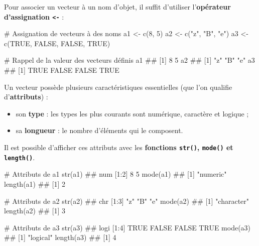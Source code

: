 \documentclass[12pt,twosided, notitlepage]{book}
\newenvironment{Shaded}{}{}
\newcommand{\KeywordTok}[1]{\textcolor[rgb]{0.00,0.00,1.00}{#1}}
\newcommand{\DecValTok}[1]{#1}
\newcommand{\StringTok}[1]{\textcolor[rgb]{0.00,0.50,0.50}{#1}}
\newcommand{\CommentTok}[1]{\textcolor[rgb]{0.00,0.50,0.00}{#1}}
\newcommand{\OtherTok}[1]{\textcolor[rgb]{1.00,0.25,0.00}{#1}}
\newcommand{\NormalTok}[1]{#1}
\providecommand{\tightlist}{%
  \setlength{\itemsep}{0pt}\setlength{\parskip}{0pt}}
\renewenvironment{Shaded}{\begin{snugshade}}{\end{snugshade}}
\begin{document}
Pour associer un vecteur à un nom d'objet, il suffit d'utiliser
l'\textbf{opérateur d'assignation
\texttt{\textless{}-}}\index{\texttt{<-}} :

\begin{Shaded}
\begin{Highlighting}[]
\CommentTok{# Assignation de vecteurs à des noms}
\NormalTok{a1 <-}\StringTok{ }\KeywordTok{c}\NormalTok{(}\DecValTok{8}\NormalTok{, }\DecValTok{5}\NormalTok{)}
\NormalTok{a2 <-}\StringTok{ }\KeywordTok{c}\NormalTok{(}\StringTok{"z"}\NormalTok{, }\StringTok{"B"}\NormalTok{, }\StringTok{"e"}\NormalTok{)}
\NormalTok{a3 <-}\StringTok{ }\KeywordTok{c}\NormalTok{(}\OtherTok{TRUE}\NormalTok{, }\OtherTok{FALSE}\NormalTok{, }\OtherTok{FALSE}\NormalTok{, }\OtherTok{TRUE}\NormalTok{)}

\CommentTok{# Rappel de la valeur des vecteurs définis}
\NormalTok{a1}
\NormalTok{  ## [1] 8 5}
\NormalTok{a2}
\NormalTok{  ## [1] "z" "B" "e"}
\NormalTok{a3}
\NormalTok{  ## [1]  TRUE FALSE FALSE  TRUE}
\end{Highlighting}
\end{Shaded}

Un vecteur possède plusieurs caractéristiques essentielles (que l'on
qualifie d'\textbf{attributs}) :

\begin{itemize}
\tightlist
\item
  son \textbf{type} : les types les plus courants sont numérique,
  caractère et logique ;
\item
  sa \textbf{longueur} : le nombre d'éléments qui le composent.
\end{itemize}

Il est possible d'afficher ces attributs avec les \textbf{fonctions
\texttt{str()}, \texttt{mode()} et
\texttt{length()}}.

\begin{Shaded}
\begin{Highlighting}[]
\CommentTok{# Attributs de a1}
\KeywordTok{str}\NormalTok{(a1)}
\NormalTok{  ##  num [1:2] 8 5}
\KeywordTok{mode}\NormalTok{(a1)}
\NormalTok{  ## [1] "numeric"}
\KeywordTok{length}\NormalTok{(a1)}
\NormalTok{  ## [1] 2}

\CommentTok{# Attributs de a2}
\KeywordTok{str}\NormalTok{(a2)}
\NormalTok{  ##  chr [1:3] "z" "B" "e"}
\KeywordTok{mode}\NormalTok{(a2)}
\NormalTok{  ## [1] "character"}
\KeywordTok{length}\NormalTok{(a2)}
\NormalTok{  ## [1] 3}

\CommentTok{# Attributs de a3}
\KeywordTok{str}\NormalTok{(a3)}
\NormalTok{  ##  logi [1:4] TRUE FALSE FALSE TRUE}
\KeywordTok{mode}\NormalTok{(a3)}
\NormalTok{  ## [1] "logical"}
\KeywordTok{length}\NormalTok{(a3)}
\NormalTok{  ## [1] 4}
\end{Highlighting}
\end{Shaded}
\end{document}
